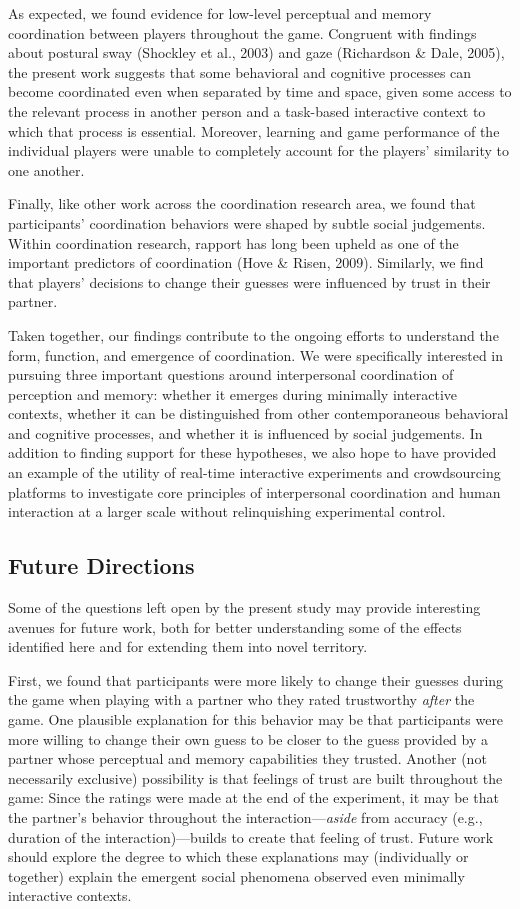 \documentclass[10pt, letterpaper]{article}
\begin{document}
As expected, we found evidence for low-level perceptual and memory
coordination between players throughout the game. Congruent with
findings about postural sway (Shockley et al., 2003) and gaze
(Richardson \& Dale, 2005), the present work suggests that some
behavioral and cognitive processes can become coordinated even when
separated by time and space, given some access to the relevant process
in another person and a task-based interactive context to which that
process is essential. Moreover, learning and game performance of the
individual players were unable to completely account for the players'
similarity to one another.

Finally, like other work across the coordination research area, we found
that participants' coordination behaviors were shaped by subtle social
judgements. Within coordination research, rapport has long been upheld
as one of the important predictors of coordination (Hove \& Risen,
2009). Similarly, we find that players' decisions to change their
guesses were influenced by trust in their partner.

Taken together, our findings contribute to the ongoing efforts to
understand the form, function, and emergence of coordination. We were
specifically interested in pursuing three important questions around
interpersonal coordination of perception and memory: whether it emerges
during minimally interactive contexts, whether it can be distinguished
from other contemporaneous behavioral and cognitive processes, and
whether it is influenced by social judgements. In addition to finding
support for these hypotheses, we also hope to have provided an example
of the utility of real-time interactive experiments and crowdsourcing
platforms to investigate core principles of interpersonal coordination
and human interaction at a larger scale without relinquishing
experimental control.

\subsection{Future Directions}\label{future-directions}

Some of the questions left open by the present study may provide
interesting avenues for future work, both for better understanding some
of the effects identified here and for extending them into novel
territory.

First, we found that participants were more likely to change their
guesses during the game when playing with a partner who they rated
trustworthy \emph{after} the game. One plausible explanation for this
behavior may be that participants were more willing to change their own
guess to be closer to the guess provided by a partner whose perceptual
and memory capabilities they trusted. Another (not necessarily
exclusive) possibility is that feelings of trust are built throughout
the game: Since the ratings were made at the end of the experiment, it
may be that the partner's behavior throughout the
interaction---\emph{aside} from accuracy (e.g., duration of the
interaction)---builds to create that feeling of trust. Future work
should explore the degree to which these explanations may (individually
or together) explain the emergent social phenomena observed even
minimally interactive contexts.
\end{document}
